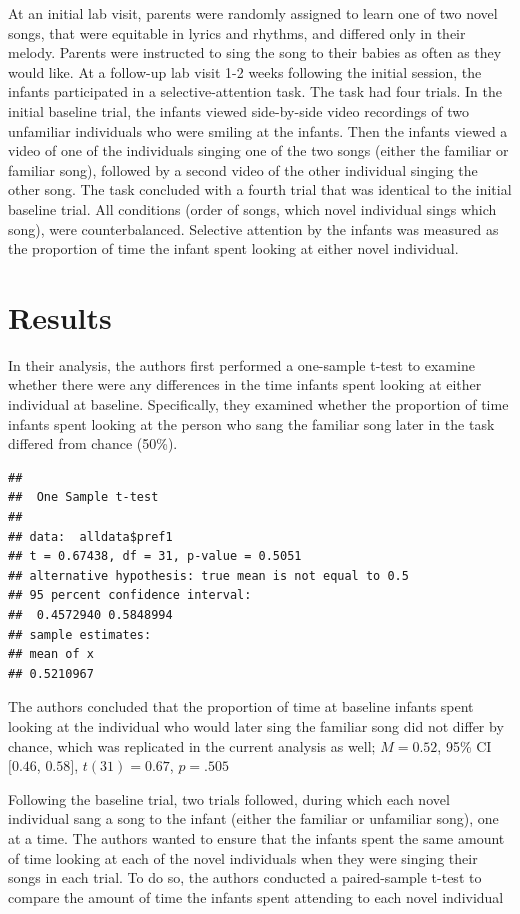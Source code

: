 \documentclass[
  english,
  man]{apa6}
\begin{document}
At an initial lab visit, parents were randomly assigned to learn one of two novel songs, that were equitable in lyrics and rhythms, and differed only in their melody. Parents were instructed to sing the song to their babies as often as they would like.
At a follow-up lab visit 1-2 weeks following the initial session, the infants participated in a selective-attention task. The task had four trials. In the initial baseline trial, the infants viewed side-by-side video recordings of two unfamiliar individuals who were smiling at the infants. Then the infants viewed a video of one of the individuals singing one of the two songs (either the familiar or familiar song), followed by a second video of the other individual singing the other song. The task concluded with a fourth trial that was identical to the initial baseline trial. All conditions (order of songs, which novel individual sings which song), were counterbalanced. Selective attention by the infants was measured as the proportion of time the infant spent looking at either novel individual.

\hypertarget{results}{%
\section{Results}\label{results}}

In their analysis, the authors first performed a one-sample t-test to examine whether there were any differences in the time infants spent looking at either individual at baseline. Specifically, they examined whether the proportion of time infants spent looking at the person who sang the familiar song later in the task differed from chance (50\%).

\begin{verbatim}
## 
##  One Sample t-test
## 
## data:  alldata$pref1
## t = 0.67438, df = 31, p-value = 0.5051
## alternative hypothesis: true mean is not equal to 0.5
## 95 percent confidence interval:
##  0.4572940 0.5848994
## sample estimates:
## mean of x 
## 0.5210967
\end{verbatim}

The authors concluded that the proportion of time at baseline infants spent looking at the individual who would later sing the familiar song did not differ by chance, which was replicated in the current analysis as well; \(M = 0.52\), 95\% CI \([0.46\), \(0.58]\), \(t(31) = 0.67\), \(p = .505\)

Following the baseline trial, two trials followed, during which each novel individual sang a song to the infant (either the familiar or unfamiliar song), one at a time. The authors wanted to ensure that the infants spent the same amount of time looking at each of the novel individuals when they were singing their songs in each trial. To do so, the authors conducted a paired-sample t-test to compare the amount of time the infants spent attending to each novel individual
\end{document}
